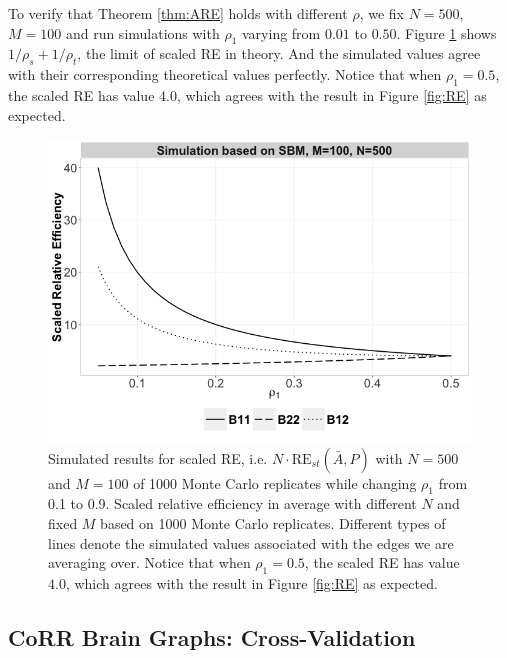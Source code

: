 \documentclass[a4paper]{article}
\begin{document}
To verify that Theorem \ref{thm:ARE} holds with different $\rho$, we fix $N=500$, $M=100$ and run simulations with $\rho_1$ varying from $0.01$ to $0.50$. Figure \ref{fig:RErho} shows $1/\rho_s + 1/\rho_t$, the limit of scaled RE in theory. And the simulated values agree with their corresponding theoretical values perfectly. Notice that when $\rho_1 = 0.5$, the scaled RE has value $4.0$, which agrees with the result in Figure \ref{fig:RE} as expected.

\begin{figure}[!htb]
\centering
\includegraphics[width=1\textwidth]{Rho.png}
\caption{Simulated results for scaled RE, i.e. $N \cdot \mathrm{RE}_{st}(\bar{A}, \hat{P})$ with $N = 500$ and $M = 100$ of 1000 Monte Carlo replicates while changing $\rho_1$ from 0.1 to 0.9. Scaled relative efficiency in average with different $N$ and fixed $M$ based on 1000 Monte Carlo replicates. Different types of lines denote the simulated values associated with the edges we are averaging over. Notice that when $\rho_1 = 0.5$, the scaled RE has value $4.0$, which agrees with the result in Figure \ref{fig:RE} as expected.}
\label{fig:RErho}
\end{figure}

\subsection{CoRR Brain Graphs: Cross-Validation}
\end{document}
